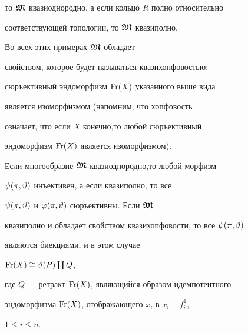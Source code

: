 то $\boldsymbol{\frak M}$ квазиоднородно, а если кольцо $R$ полно относительно


соответствующей топологии, то $\boldsymbol{\frak M}$ квазиполно.


Во всех этих примерах $\boldsymbol{\frak M}$ обладает


свойством, которое будет называться квазихопфовостью:


сюръективный эндоморфизм $\operatorname{Fr}(X)$ указанного выше вида


является изоморфизмом (напомним, что хопфовость


\cite{BA} означает, что если $X$ конечно,то любой сюръективный


эндоморфизм $ \operatorname{Fr}(X)$ является изоморфизмом).





\begin{thm}


Если многообразие $\boldsymbol{\frak M}$ квазиоднородно,то любой морфизм


$\psi(\pi,\vartheta)$ инъективен, а если квазиполно, то все


$\psi(\pi,\vartheta)$ и $\varphi(\pi,\vartheta)$ сюръективны. Если $\boldsymbol{\frak M}$


квазиполно и обладает свойством квазихопфовости, то все $\psi(\pi,\vartheta)$


являются биекциями, и в этом случае


$ \operatorname{Fr}(X) \cong \vartheta(P) \coprod Q$,


где $Q$ --- ретракт $\operatorname{Fr}(X)$, являющийся образом идемпотентного


эндоморфизма $\operatorname{Fr}(X)$, отображающего $x_i$ в $x_i-f_i^1$,


$1 \le i \le n$.


\end{thm}





